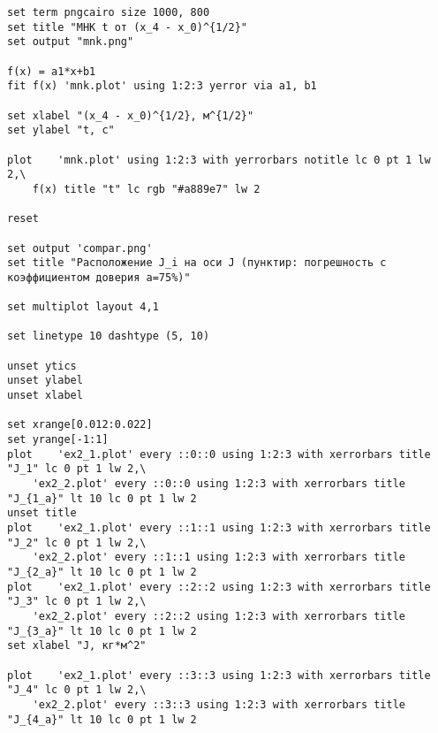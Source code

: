 \documentclass{article}
\begin{document}
\begin{verbatim}
set term pngcairo size 1000, 800
set title "МНК t от (x_4 - x_0)^{1/2}"
set output "mnk.png"

f(x) = a1*x+b1
fit f(x) 'mnk.plot' using 1:2:3 yerror via a1, b1

set xlabel "(x_4 - x_0)^{1/2}, м^{1/2}"
set ylabel "t, c"

plot 	'mnk.plot' using 1:2:3 with yerrorbars notitle lc 0 pt 1 lw 2,\
	f(x) title "t" lc rgb "#a889e7" lw 2

reset

set output 'compar.png'
set title "Расположение J_i на оси J (пунктир: погрешность с коэффициентом доверия a=75%)"

set multiplot layout 4,1

set linetype 10 dashtype (5, 10)

unset ytics
unset ylabel
unset xlabel

set xrange[0.012:0.022]
set yrange[-1:1]
plot 	'ex2_1.plot' every ::0::0 using 1:2:3 with xerrorbars title "J_1" lc 0 pt 1 lw 2,\
	'ex2_2.plot' every ::0::0 using 1:2:3 with xerrorbars title "J_{1_a}" lt 10 lc 0 pt 1 lw 2 
unset title
plot 	'ex2_1.plot' every ::1::1 using 1:2:3 with xerrorbars title "J_2" lc 0 pt 1 lw 2,\
	'ex2_2.plot' every ::1::1 using 1:2:3 with xerrorbars title "J_{2_a}" lt 10 lc 0 pt 1 lw 2 
plot 	'ex2_1.plot' every ::2::2 using 1:2:3 with xerrorbars title "J_3" lc 0 pt 1 lw 2,\
	'ex2_2.plot' every ::2::2 using 1:2:3 with xerrorbars title "J_{3_a}" lt 10 lc 0 pt 1 lw 2 
set xlabel "J, кг*м^2"

plot 	'ex2_1.plot' every ::3::3 using 1:2:3 with xerrorbars title "J_4" lc 0 pt 1 lw 2,\
	'ex2_2.plot' every ::3::3 using 1:2:3 with xerrorbars title "J_{4_a}" lt 10 lc 0 pt 1 lw 2 

\end{verbatim}
\end{document}
